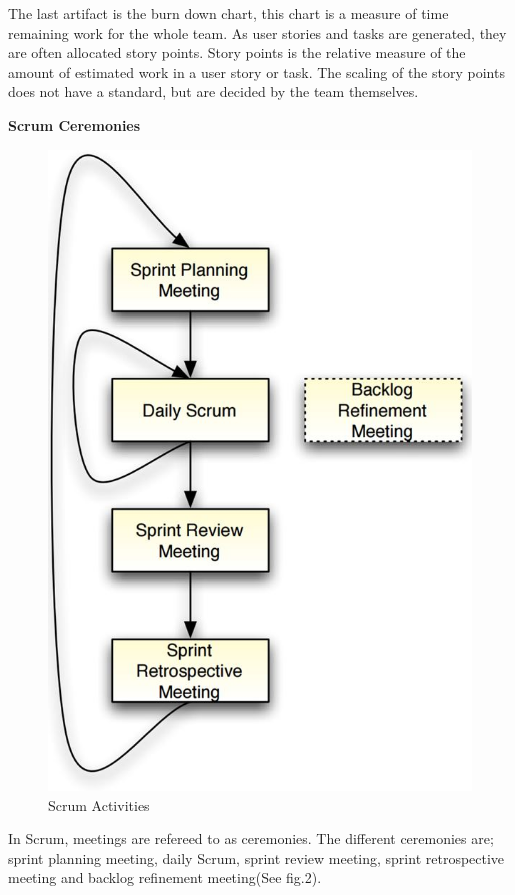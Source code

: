 The last artifact is the burn down chart, this chart is a measure of time remaining work for the whole team. As user stories and tasks are generated, they are often allocated story points. Story points is the relative measure of the amount of estimated work in a user story or task. The scaling of the story points does not have a standard, but are decided by the team themselves.


\newpage
\textbf{\LARGE Scrum Ceremonies} \\
\begin{figure}
  \begin{center}
    \includegraphics[scale=0.4]{VAPIQ-PICTURES/ScrumActivities}
  \end{center}
  \caption*{Scrum Activities}
\end{figure}
In Scrum, meetings are refereed to as ceremonies. The different ceremonies are; sprint planning meeting, daily Scrum, sprint review meeting, sprint retrospective meeting and backlog refinement meeting(See fig.2). \\

